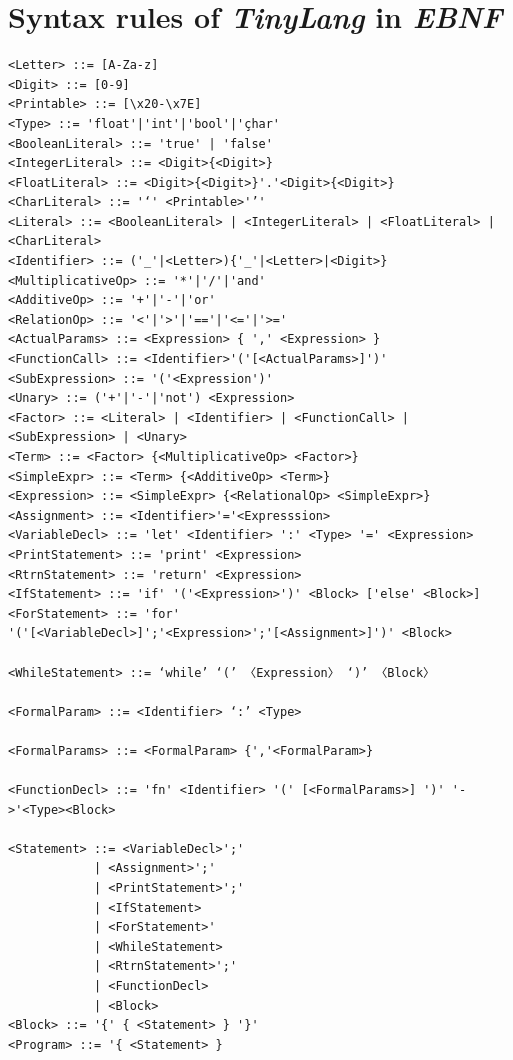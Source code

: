 \section{Syntax rules of \emph{TinyLang} in \emph{EBNF}}
\label{sec:ebnf-tinylang-rules}
\begin{lstlisting}[caption = EBNF capturing the Syntax Rules of \emph{TinyLang}.]
<Letter> ::= [A-Za-z]
<Digit> ::= [0-9]
<Printable> ::= [\x20-\x7E]
<Type> ::= 'float'|'int'|'bool'|'çhar'
<BooleanLiteral> ::= 'true' | 'false'
<IntegerLiteral> ::= <Digit>{<Digit>}
<FloatLiteral> ::= <Digit>{<Digit>}'.'<Digit>{<Digit>}
<CharLiteral> ::= '‘' <Printable>'’'
<Literal> ::= <BooleanLiteral> | <IntegerLiteral> | <FloatLiteral> | <CharLiteral>
<Identifier> ::= ('_'|<Letter>){'_'|<Letter>|<Digit>}
<MultiplicativeOp> ::= '*'|'/'|'and'
<AdditiveOp> ::= '+'|'-'|'or'
<RelationOp> ::= '<'|'>'|'=='|'<='|'>='
<ActualParams> ::= <Expression> { ',' <Expression> }
<FunctionCall> ::= <Identifier>'('[<ActualParams>]')'
<SubExpression> ::= '('<Expression')'
<Unary> ::= ('+'|'-'|'not') <Expression>
<Factor> ::= <Literal> | <Identifier> | <FunctionCall> | <SubExpression> | <Unary>
<Term> ::= <Factor> {<MultiplicativeOp> <Factor>}
<SimpleExpr> ::= <Term> {<AdditiveOp> <Term>}
<Expression> ::= <SimpleExpr> {<RelationalOp> <SimpleExpr>}
<Assignment> ::= <Identifier>'='<Expresssion>
<VariableDecl> ::= 'let' <Identifier> ':' <Type> '=' <Expression>
<PrintStatement> ::= 'print' <Expression>
<RtrnStatement> ::= 'return' <Expression>
<IfStatement> ::= 'if' '('<Expression>')' <Block> ['else' <Block>]
<ForStatement> ::= 'for' '('[<VariableDecl>]';'<Expression>';'[<Assignment>]')' <Block>

<WhileStatement> ::= ‘while’ ‘(’ 〈Expression〉 ‘)’ 〈Block〉

<FormalParam> ::= <Identifier> ‘:’ <Type>

<FormalParams> ::= <FormalParam> {','<FormalParam>}

<FunctionDecl> ::= 'fn' <Identifier> '(' [<FormalParams>] ')' '->'<Type><Block>

<Statement> ::= <VariableDecl>';' 
            | <Assignment>';'
            | <PrintStatement>';'
            | <IfStatement>
            | <ForStatement>'
            | <WhileStatement>
            | <RtrnStatement>';'
            | <FunctionDecl>
            | <Block>
<Block> ::= '{' { <Statement> } '}'        
<Program> ::= '{ <Statement> }         
            
\end{lstlisting}

